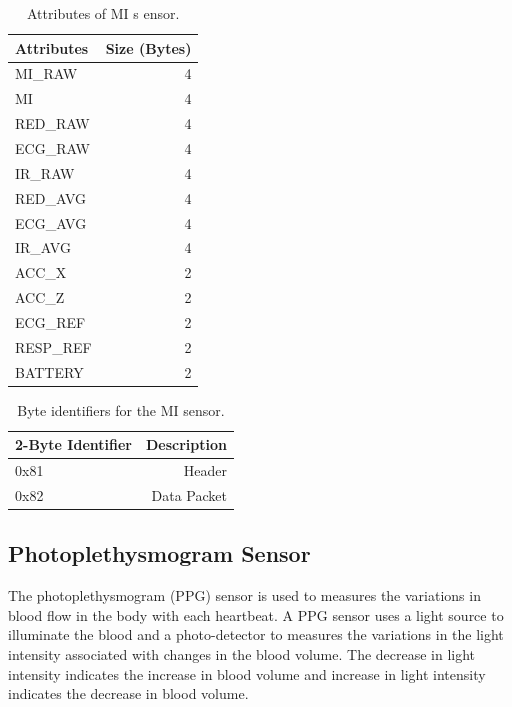 \renewcommand{\arraystretch}{2}
\begin{table}
	\caption{Attributes of MI s
		ensor.} \label{tab:att_mi}
	
	\begin{center}
		\begin{tabular}{ | l | r | }
			\hline
			\textbf{Attributes} & \textbf{Size (Bytes)} \\ \hline
			MI\_RAW  & 4 \\ \hline
			MI  & 4  \\ \hline
			RED\_RAW  & 4  \\ \hline
			ECG\_RAW  & 4  \\ \hline
			IR\_RAW  & 4  \\ \hline
			RED\_AVG  & 4  \\ \hline
			ECG\_AVG  & 4  \\ \hline
			IR\_AVG  & 4  \\ \hline
			ACC\_X  & 2  \\ \hline
			ACC\_Z  & 2  \\ \hline
			ECG\_REF  & 2  \\ \hline
			RESP\_REF  & 2  \\ \hline
			BATTERY  & 2  \\ \hline
		\end{tabular}
	\end{center}
	
\end{table}


\renewcommand{\arraystretch}{2}
\begin{table}
	\caption{Byte identifiers for the MI sensor.} \label{tab:bi_mi}
	
	\begin{center}
		\begin{tabular}{ | l | r | }
			\hline
			\textbf{2-Byte Identifier} & \textbf{Description} \\ \hline
			0x81  & Header \\ \hline
			0x82  & Data Packet  \\ \hline
		\end{tabular}
	\end{center}
	
\end{table}

\subsection{Photoplethysmogram Sensor}
The photoplethysmogram (PPG) sensor is used to measures the variations in blood flow in the body with each heartbeat. A PPG sensor uses a light source to illuminate the blood and a photo-detector to measures the variations in the light intensity associated with changes in the blood volume. The decrease in light intensity indicates the increase in blood volume and increase in light intensity indicates the decrease in blood volume.

